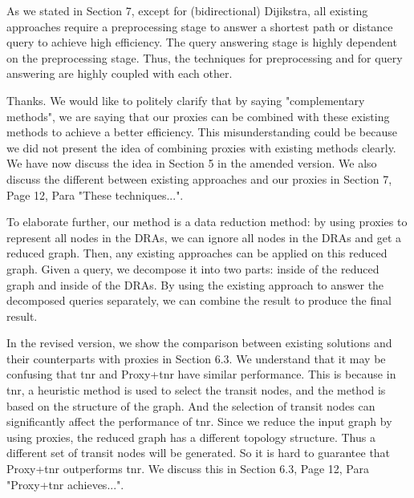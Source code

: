 \documentclass[11pt]{letter}
\newcommand{\vs}{\vspace{1ex}}
\newcommand{\svs}{\vspace{0.36ex}}
\newcommand{\tnr}{{\sc tnr}\xspace}
\begin{document}
As we stated in Section 7, except for (bidirectional) Dijikstra, all existing approaches require a preprocessing stage to answer a shortest path or distance query to achieve high efficiency. The query answering stage is highly dependent on the preprocessing stage. Thus, the techniques for preprocessing and for query answering are highly coupled with each other.


\vs{}
\svs

Thanks. We would like to politely clarify that by saying "complementary methods", we are saying that our proxies can be combined with these existing methods to achieve a better efficiency. This misunderstanding could be because we did not present the idea of combining proxies with existing methods clearly. We have now discuss the idea in Section 5 in the amended version. We also discuss the different between existing approaches and our proxies in Section 7, Page 12, Para "These techniques...".

To elaborate further, our method is a data reduction method: by using proxies to represent all nodes in the DRAs, we can ignore all nodes in the DRAs and get a reduced graph. Then, any existing approaches can be applied on this reduced graph. Given a query, we decompose it into two parts: inside of the reduced graph and inside of the DRAs. By using the existing approach to answer the decomposed queries separately, we can combine the result to produce the final result.

In the revised version, we show the comparison between existing solutions and their counterparts with proxies in Section 6.3. We understand that it may be confusing that \tnr and Proxy+\tnr have similar performance. This is because in \tnr, a heuristic method is used to select the transit nodes, and the method is based on the structure of the graph. And the selection of transit nodes can significantly affect the performance of \tnr. Since we reduce the input graph by using proxies, the reduced graph has a different topology structure. Thus a different set of transit nodes will be generated. So it is hard to guarantee that Proxy+\tnr outperforms \tnr. We discuss this in Section 6.3, Page 12, Para "Proxy+\tnr achieves...".
\end{document}

